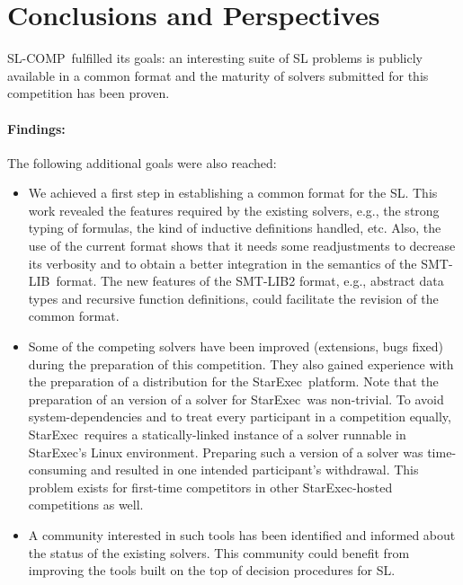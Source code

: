 \documentclass[twoside,11pt]{article}
\newcommand{\smtlib}{\textsf{SMT-LIB}}
\newcommand{\slcomp}{\textsf{SL-COMP}}
\newcommand{\starexec}{\textsf{StarExec}}
\begin{document}
\section{Conclusions and Perspectives}

\slcomp\ fulfilled its goals:
an interesting suite of SL problems is publicly available in a common format and
the maturity of solvers submitted for this competition has been proven.

\paragraph{Findings:}
The following additional goals were also reached:
\begin{itemize}
\item We achieved a first step in establishing a common format for the SL. 
This work revealed the features required by the existing solvers, e.g., the strong typing of formulas, the kind of inductive definitions handled, etc.
Also, the use of the current format shows that it needs some readjustments to decrease its verbosity and to obtain a better integration in the semantics of the \smtlib\ format. 
The new features of the \smtlib 2 format, e.g., abstract data types and recursive function definitions, could facilitate the revision of the common format.

\item Some of the competing solvers have been improved (extensions, bugs fixed) during the preparation of this competition. They also gained experience with the preparation of a distribution for the \starexec\ platform. 
%
Note that the preparation of an version of a solver for \starexec\ was non-trivial. 
To avoid system-dependencies and to treat every participant in a competition equally, \starexec\ requires a 
statically-linked instance of a solver runnable in \starexec's Linux environment. Preparing such a version
of a solver was time-consuming and resulted in one intended participant's withdrawal. This problem
exists for first-time competitors in other \starexec-hosted competitions as well.

\item A community interested in such tools has been identified and informed about the status of the existing solvers.
This community could benefit from improving the tools built on the top of decision procedures for SL.


\end{itemize}
\end{document}
